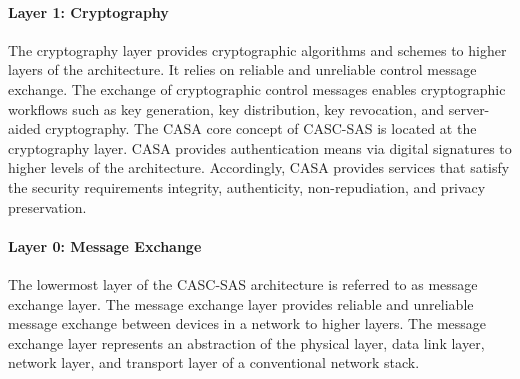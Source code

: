 \paragraph{Layer 1: Cryptography}
The cryptography layer provides cryptographic algorithms and schemes to higher layers of the architecture.
It relies on reliable and unreliable control message exchange.
The exchange of cryptographic control messages enables cryptographic workflows such as key generation, key distribution, key revocation, and server-aided cryptography.
The CASA core concept of CASC-SAS is located at the cryptography layer.
CASA provides authentication means via digital signatures to higher levels of the architecture.
Accordingly, CASA provides services that satisfy the security requirements integrity, authenticity, non-repudiation, and privacy preservation.

\paragraph{Layer 0: Message Exchange}
The lowermost layer of the CASC-SAS architecture is referred to as message exchange layer.
The message exchange layer provides reliable and unreliable message exchange between devices in a network to higher layers.
The message exchange layer represents an abstraction of the physical layer, data link layer, network layer, and transport layer of a conventional network stack.

